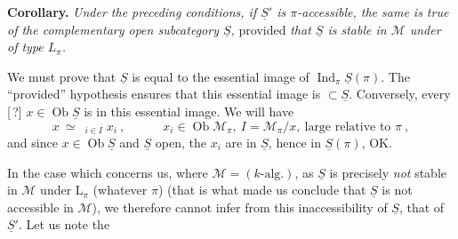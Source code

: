 \documentclass[11pt]{article}
\newcommand{\msp}[1]{\marginpar{\footnotesize [#1]}}
\newcommand{\limind}{\mathop{\underrightarrow{\mathrm{lim}}}}
\begin{document}
\textbf{Corollary.} \textit{Under the preceding conditions, if $\underline{S}'$ is $\pi$-accessible, the same is true of the complementary open subcategory $\underline{S}$,} provided \textit{that $\underline{S}$ is stable in $\mathcal{M}$ under $\limind$ of type $L_\pi$.}

We must prove that $\underline{S}$ is equal to the essential image of $\operatorname{Ind}_\pi\underline{S}(\pi)$. The ``provided'' hypothesis ensures that this essential image is $\subset\underline{S}$. Conversely, every [\,?] $x\in\operatorname{Ob}\underline{S}$ is in this essential image. We will have
\[
x\ \simeq\ \limind_{i\in I}x_i\ ,\qquad\quad x_i\in\operatorname{Ob}\mathcal{M}_\pi,\ I=\mathcal{M}_\pi/x,\ \text{large relative to } \pi\ ,
\]
and since $x\in\operatorname{Ob}\underline{S}$ and $\underline{S}$ open, the $x_i$ are in $\underline{S}$, hence in $\underline{S}(\pi)$, OK.

In the case which concerns us, where $\mathcal{M}=(k\text{-alg.})$, as $\underline{S}$ is precisely \textit{not} stable in $\mathcal{M}$ under $\mathrm{L}_\pi$ (whatever $\pi$) (that is what made us conclude that
\msp{page 19}
$\underline{S}$ is not accessible in $\mathcal{M}$), we therefore cannot infer from this inaccessibility of $\underline{S}$, that of $\underline{S}'$. Let us note the
\end{document}
